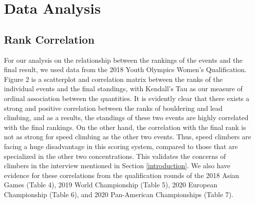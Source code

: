 \documentclass[12pt]{article}
\begin{document}
\hypertarget{data-analysis}{%
\section{Data Analysis}\label{data-analysis}}

\hypertarget{rank-correlation}{%
\subsection{Rank Correlation}\label{rank-correlation}}

For our analysis on the relationship between the rankings of the events
and the final result, we used data from the 2018 Youth Olympics Women's
Qualification. Figure 2 is a scatterplot and correlation matrix between
the ranks of the individual events and the final standings, with
Kendall's Tau \citep{kendall1938} as our measure of ordinal association
between the quantities. It is evidently clear that there exists a strong
and positive correlation between the ranks of bouldering and lead
climbing, and as a results, the standings of these two events are highly
correlated with the final rankings. On the other hand, the correlation
with the final rank is not as strong for speed climbing as the other two
events. Thus, speed climbers are facing a huge disadvantage in this
scoring system, compared to those that are specialized in the other two
concentrations. This validates the concerns of climbers in the interview
mentioned in Section \ref{introduction}. We also have evidence for these
correlations from the qualification rounds of the 2018 Asian Games
(Table 4), 2019 World Championship (Table 5), 2020 European Championship
(Table 6), and 2020 Pan-American Championships (Table 7).
\end{document}
